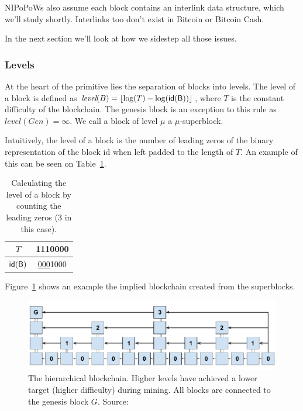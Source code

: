 \documentclass[11pt]{llncs}
\begin{document}
NIPoPoWs also assume each block contains an interlink data structure, which
we'll study shortly. Interlinks too don't exist in Bitcoin or Bitcoin Cash.

In the next section we'll look at how we sidestep all those issues.

\subsubsection{Levels}
At the heart of the primitive lies the separation of blocks into levels. The
level of a block is defined as $\textit{level}(B) = \left \lfloor \log(T) -
\log(\sf{id}(B)) \right \rfloor$, where $T$ is the constant difficulty of the
blockchain. The genesis block is an exception to this rule as
$\textit{level}(Gen) = \infty$. We call a block of level $\mu$ a $\mu$-superblock.

Intuitively, the level of a block is the number of leading zeros of the binary
representation of the block id when left padded to the length of $T$. An
example of this can be seen on Table~\ref{table:level-counting}.

\begin{table}
  \centering
  \begin{tabular}{|c|c|}
    \hline
    $T$ & 1110000 \\
    \hline
    $\sf{id}(B)$ & \underline{000}1000 \\
    \hline
  \end{tabular}
  \caption{Calculating the level of a block by counting the leading zeros (3 in this case).}
  \label{table:level-counting}
\end{table}

Figure~\ref{fig:hierarchy} shows an example the implied blockchain created from the superblocks.

\begin{figure}
  \centering
  \includegraphics[width=0.9\columnwidth,keepaspectratio]{figures/hierarchical-ledger.png}
  \caption{The hierarchical blockchain.
  Higher levels have achieved a lower target (higher difficulty) during
  mining. All blocks are connected to the genesis block $G$. Source:~\cite{nipopows}}
  \label{fig:hierarchy}
\end{figure}
\end{document}
